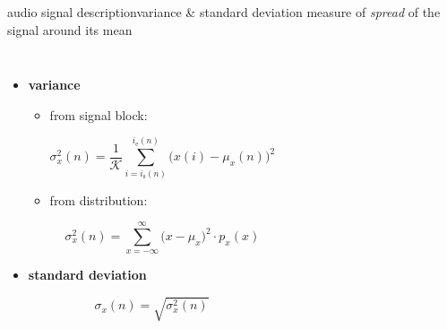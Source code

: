 \begin{frame}{audio signal description}{variance \& standard deviation}
    \vspace{-2mm}
    measure of \textit{spread} of the signal around its mean
    \vspace{-5mm}
    \begin{columns}
    \begin{itemize}
        \item \textbf{variance}
            \begin{itemize}
                \item   from signal block:
                \vspace{-2mm}
                    \begin{footnotesize}
                    \begin{equation*}
                        \sigma_x^2(n) = \frac{1}{\mathcal{K}}\sum\limits_{i= i_{\mathrm{s}}(n)}^{i_{\mathrm{e}}(n)}{\big(x(i)-\mu_x(n)\big)^2} 
                    \end{equation*}
                     \end{footnotesize}
                \pause
                \item   from distribution:
                \vspace{-2mm}
                     \begin{footnotesize}
                    \begin{equation*}
                        \sigma_x^2(n) = \sum\limits_{x=-\infty}^{\infty}{\big(x-\mu_x\big)^2\cdot p_x(x)} 
                    \end{equation*}
                     \end{footnotesize}
            \end{itemize}
        \pause
        \bigskip
        \item \textbf{standard deviation}
                \vspace{-2mm}
                 \begin{footnotesize}
            \begin{equation*}
                \sigma_x(n) = \sqrt{\sigma_x^2(n)} 
            \end{equation*}
             \end{footnotesize}
    \end{itemize}
        
    \end{columns}
\end{frame}

